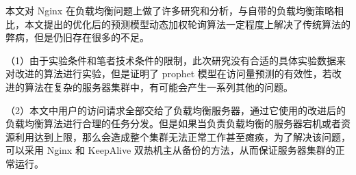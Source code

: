 本文对 Nginx 在负载均衡问题上做了许多研究和分析，与自带的负载均衡策略相比，本文提出的优化后的预测模型动态加权轮询算法一定程度上解决了传统算法的弊病，但是仍旧存在很多的不足。

（1）由于实验条件和笔者技术条件的限制，此次研究没有合适的具体实验数据来对改进的算法进行实验，但是证明了 prophet 模型在访问量预测的有效性，若改进的算法在复杂的服务器集群中，有可能会产生一系列其他的问题。

（2）本文中用户的访问请求全部交给了负载均衡服务器，通过它使用的改进后的负载均衡算法进行合理的任务分发。但是如果当负责负载均衡的服务器宕机或者资源利用达到上限，那么会造成整个集群无法正常工作甚至瘫痪，为了解决该问题，可以采用 Nginx 和 KeepAlive 双热机主从备份的方法，从而保证服务器集群的正常运行。
